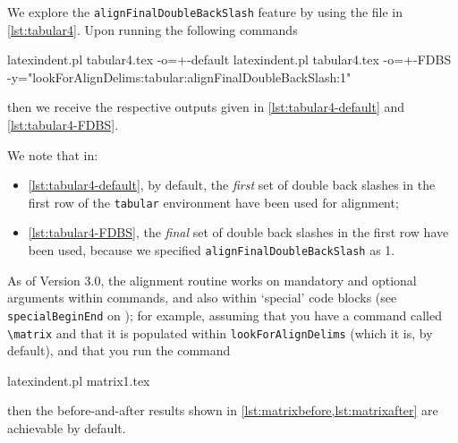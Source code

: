 	We explore%
	 the
	\texttt{alignFinalDoubleBackSlash} feature by using the file in \cref{lst:tabular4}. Upon
	running the following commands
	\begin{commandshell}
latexindent.pl tabular4.tex -o=+-default
latexindent.pl tabular4.tex -o=+-FDBS -y="lookForAlignDelims:tabular:alignFinalDoubleBackSlash:1"
\end{commandshell}
	then we receive the respective outputs given in \cref{lst:tabular4-default} and
	\cref{lst:tabular4-FDBS}.

	\begin{cmhtcbraster}[raster columns=3,
			raster left skip=-3.75cm,
			raster right skip=-2cm,]
	\end{cmhtcbraster}

	We note that in:
	\begin{itemize}
		\item \cref{lst:tabular4-default}, by default, the \emph{first} set of double back
		      slashes in the first row of the \texttt{tabular} environment have been used for
		      alignment;
		\item \cref{lst:tabular4-FDBS}, the \emph{final} set of double back slashes in the
		      first row have been used, because we specified \texttt{alignFinalDoubleBackSlash} as 1.
	\end{itemize}

	As of Version 3.0, the alignment routine works on mandatory and optional arguments within
	commands, and also within `special' code blocks (see \texttt{specialBeginEnd} on
	); for example, assuming that you have a command called
	\lstinline!\matrix! and that it is populated within \texttt{lookForAlignDelims} (which it is, by default), and that
	you run the command
	\begin{commandshell}
latexindent.pl matrix1.tex 
\end{commandshell}
	then the before-and-after results shown in \cref{lst:matrixbefore,lst:matrixafter} are achievable by
	default.

